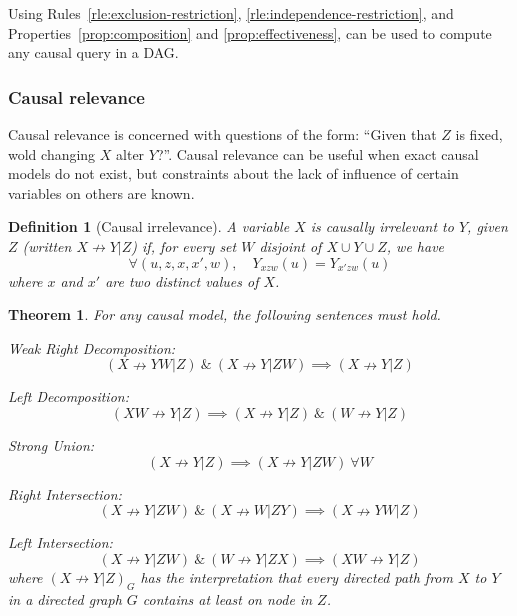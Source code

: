 \documentclass[11pt]{article}
\numberwithin{equation}{section}
\newtheorem{thm}{Theorem}[section]
\newtheorem{defn}{Definition}[section]
\begin{document}
Using Rules~\ref{rle:exclusion-restriction}, \ref{rle:independence-restriction}, and Properties~\ref{prop:composition} and \ref{prop:effectiveness}, can be used to compute any causal query in a DAG.

\subsubsection{Causal relevance}
Causal relevance is concerned with questions of the form: ``Given that $Z$ is fixed, wold changing $X$ alter $Y$?''. Causal relevance can be useful when exact causal models do not exist, but constraints about the lack of influence of certain variables on others are known.

\begin{defn}[Causal irrelevance]
A variable $X$ is causally irrelevant to $Y$, given $Z$ (written $X \nrightarrow Y|Z$) if, for every set $W$ disjoint of $X \cup Y \cup Z$, we have
\begin{equation}
\forall (u, z, x, x', w), \quad Y_{xzw}(u) = Y_{x'zw}(u)
\end{equation}
where $x$ and $x'$ are two distinct values of $X$.
\end{defn}

\begin{thm}
For any causal model, the following sentences must hold.

Weak Right Decomposition:
\begin{equation}
(X \nrightarrow YW|Z)\ \&\ (X \nrightarrow Y| ZW) \implies (X \nrightarrow Y|Z)
\end{equation}

Left Decomposition:
\begin{equation}
(XW \nrightarrow Y| Z) \implies (X \nrightarrow Y | Z)\ \&\ (W \nrightarrow Y | Z)
\end{equation}

Strong Union:
\begin{equation}
(X \nrightarrow Y | Z) \implies (X \nrightarrow Y|ZW)\ \forall W
\end{equation} 

Right Intersection:
\begin{equation}
(X \nrightarrow Y|ZW)\ \&\ (X \nrightarrow W| ZY) \implies (X \nrightarrow YW|Z)
\end{equation}

Left Intersection:
\begin{equation}
(X \nrightarrow Y| ZW)\ \&\ (W \nrightarrow Y | ZX) \implies (XW \nrightarrow Y| Z)
\end{equation}
where $(X \nrightarrow Y| Z)_G$ has the interpretation that every directed path from $X$ to $Y$ in a directed graph $G$ contains at least on node in $Z$.
\end{thm}
\end{document}
